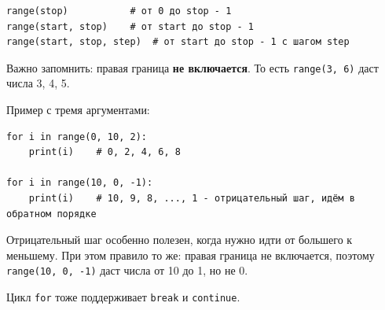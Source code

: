 \documentclass[12pt,a4paper]{article}
\begin{document}
\begin{verbatim}
range(stop)           # от 0 до stop - 1
range(start, stop)    # от start до stop - 1
range(start, stop, step)  # от start до stop - 1 с шагом step
\end{verbatim}

Важно запомнить: правая граница \textbf{не включается}. То есть \texttt{range(3, 6)} даст числа 3, 4, 5.
\bigskip

Пример с тремя аргументами:

\begin{verbatim}
for i in range(0, 10, 2):
    print(i)    # 0, 2, 4, 6, 8

for i in range(10, 0, -1):
    print(i)    # 10, 9, 8, ..., 1 - отрицательный шаг, идём в обратном порядке
\end{verbatim}

Отрицательный шаг особенно полезен, когда нужно идти от большего к меньшему. При этом правило то же: правая граница не включается, поэтому \texttt{range(10, 0, -1)} даст числа от 10 до 1, но не 0.
\medskip

Цикл \texttt{for} тоже поддерживает \texttt{break} и \texttt{continue}.
\end{document}
